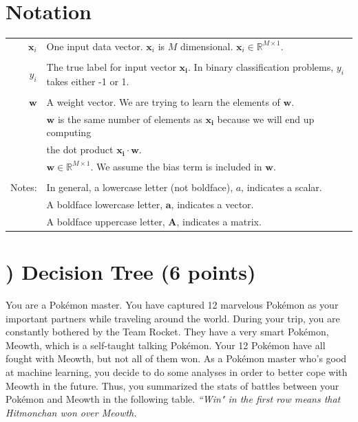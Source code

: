 \documentclass[11pt]{article}
\renewcommand{\vec}[1]{\mathbf{#1}}
\newcounter{QuestionCounter}
\newcounter{SubQuestionCounter}[QuestionCounter]
\newcommand{\newquestion}{\stepcounter{QuestionCounter}\setcounter{SubQuestionCounter}{1}\newpage}
\begin{document}
\section*{ Notation}
{
\centering
\smallskip\begin{tabular}{r l}
\(\vec{x}_i\) & One input data vector. \(\vec{x}_i\) is \(M\) dimensional.
\(\vec{x}_i \in \mathbb{R}^{M \times 1}\).  \\\\

\(y_i\) & The true label for input vector \(\vec{x_i}\). In binary classification problems,  \(y_i\) takes either -1 or 1. \\ \\

\(\vec{w}\) & A weight vector. We are trying to learn the elements of \(\vec{w}\). \\
& \(\vec{w}\) is the same number of elements as \(\vec{x_i}\) because we will end up computing \\
& the dot product \(\vec{x_i} \cdot \vec{w}\). \\
& \(\vec{w} \in \mathbb{R}^{M \times 1}\). We assume the bias term is included in \(\vec{w}\).  \\ \\


 Notes: & In general, a lowercase letter (not boldface), $a$, indicates a scalar. \\
  & A boldface lowercase letter, $\vec{a}$, indicates a vector. \\  &  A boldface uppercase letter, $\vec{A}$, indicates a matrix. \\
\end{tabular}
}


\pagebreak




\newquestion
\section*{) 
Decision Tree (6 points)} You are a Pok\'emon master. You have captured 12 marvelous Pok\'emon as your important partners while traveling around the world. During your trip, you are constantly bothered by the Team Rocket. They have a very smart Pok\'emon, Meowth, which is a self-taught talking Pok\'emon. Your 12 Pok\'emon have all fought with Meowth, but not all of them won. As a Pok\'emon master who's good at machine learning, you decide to do some analyses in order to better cope with Meowth in the future. Thus, you summarized the stats of battles between your Pok\'emon and Meowth in the following table. \textit{``Win" in the first row means that Hitmonchan won over Meowth.}\\
\end{document}

